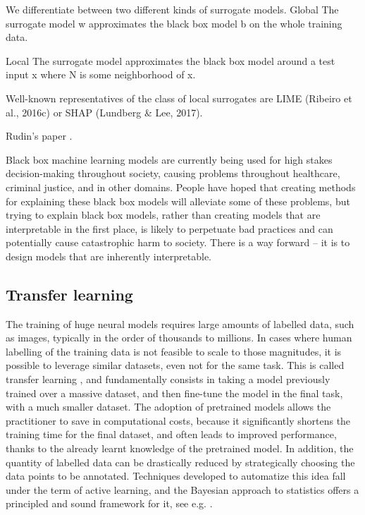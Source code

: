 We differentiate between two different kinds of surrogate models.
Global The surrogate model w approximates the black box model b on the whole training data.

Local The surrogate model approximates the black box model around a test input x
where N is some neighborhood of x.

Well-known representatives of the
class of local surrogates are LIME (Ribeiro et al., 2016c) or SHAP (Lundberg & Lee, 2017).


Rudin's paper \citep{rudin2019stop}.

Black box machine learning models are currently being used for high stakes decision-making throughout
society, causing problems throughout healthcare, criminal justice, and in other domains. People have hoped
that creating methods for explaining these black box models will alleviate some of these problems, but trying
to explain black box models, rather than creating models that are interpretable in the first place, is likely to
perpetuate bad practices and can potentially cause catastrophic harm to society. There is a way forward – it is
to design models that are inherently interpretable.








\subsection{Transfer learning}\label{sec:transfer}

The training of huge neural models requires large amounts of labelled data, such as images, typically in the order of thousands to millions. In cases where human labelling of the training data is not feasible to scale to those magnitudes, it is possible to leverage similar datasets, even not for the same task. This is called transfer learning \citep{tan2018survey,pan2009survey}, and fundamentally consists in taking a model previously trained over a massive dataset, and then fine-tune the model in the final task, with a much smaller dataset. The adoption of pretrained models allows the practitioner to save in computational costs, because it significantly shortens the training time for the final dataset, and often leads to improved performance, thanks to the already learnt knowledge of the pretrained model. In addition, the quantity of labelled data can be drastically reduced by strategically choosing the data points to be annotated. Techniques developed to automatize this idea fall under the term of active learning, and the Bayesian approach to statistics offers a principled and sound framework for it, see e.g. \citep{houlsby2011bayesian}.

